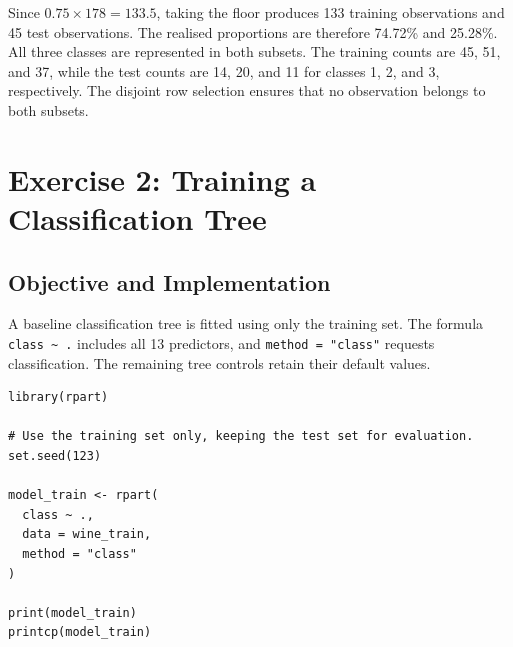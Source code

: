 \documentclass[11pt,a4paper]{article}
\begin{document}
Since $0.75\times178=133.5$, taking the floor produces 133 training observations and 45 test observations. The realised proportions are therefore 74.72\% and 25.28\%. All three classes are represented in both subsets. The training counts are 45, 51, and 37, while the test counts are 14, 20, and 11 for classes 1, 2, and 3, respectively. The disjoint row selection ensures that no observation belongs to both subsets.

\section{Exercise 2: Training a Classification Tree}
\subsection{Objective and Implementation}
A baseline classification tree is fitted using only the training set. The formula \texttt{class \textasciitilde{} .} includes all 13 predictors, and \texttt{method = "class"} requests classification. The remaining tree controls retain their default values.
\begin{lstlisting}
library(rpart)

# Use the training set only, keeping the test set for evaluation.
set.seed(123)

model_train <- rpart(
  class ~ .,
  data = wine_train,
  method = "class"
)

print(model_train)
printcp(model_train)
\end{lstlisting}
\end{document}

